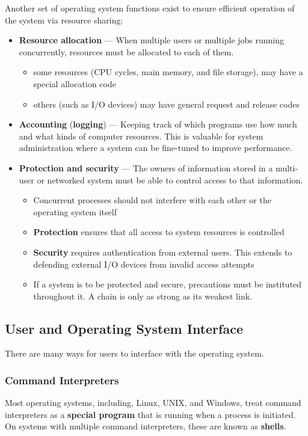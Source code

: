 \documentclass{article}
\begin{document}
Another set of operating system functions exist to ensure efficient operation of the system via resource sharing:
\begin{itemize}
    \item \textbf{Resource allocation} --- When multiple users or multiple jobs running concurrently, resources must be allocated to each of them.
          \begin{itemize}
              \item some resources (CPU cycles, main memory, and file storage), may have a special allocation code
              \item others (such as I/O devices) may have general request and release codes
          \end{itemize}
    \item \textbf{Accounting} (\textbf{logging}) --- Keeping track of which programs use how much and what kinds of computer resources.
          This is valuable for system administration where a system can be fine-tuned to improve performance.
    \item \textbf{Protection and security} --- The owners of information stored in a multi-user or networked system must be able to control access to that information.
          \begin{itemize}
              \item Concurrent processes should not interfere with each other or the operating system itself
              \item \textbf{Protection} ensures that all access to system resources is controlled
              \item \textbf{Security} requires authentication from external users. This extends to defending external I/O devices from invalid access attempts
              \item If a system is to be protected and secure, precautions must be instituted throughout it. A chain is only as strong as its weakest link.
          \end{itemize}
\end{itemize}
\subsection{User and Operating System Interface}
There are many ways for users to interface with the operating system.
\subsubsection{Command Interpreters}
Most operating systems, including, Linux, UNIX, and Windows, treat command interpreters as a \textbf{special program} that is running when a process is initiated. On systems with multiple command interpreters, these are known as \textbf{shells}.
\end{document}
